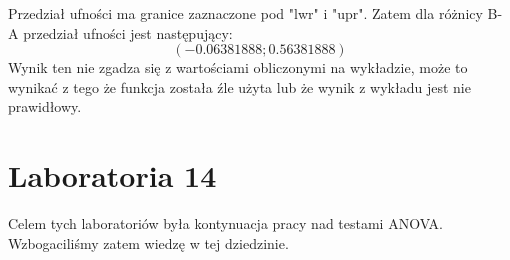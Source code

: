 \documentclass{article}
\begin{document}
Przedział ufności ma granice zaznaczone pod "lwr" i "upr". Zatem dla różnicy B-A przedział ufności jest następujący:
\[ (-0.06381888 ; 0.56381888 ) \]
Wynik ten nie zgadza się z wartościami obliczonymi na wykładzie, może to wynikać z tego że funkcja została źle użyta lub że wynik z wykładu jest nie prawidłowy.

\newpage
\part{Laboratoria 14}
Celem tych laboratoriów była kontynuacja pracy nad testami ANOVA. Wzbogaciliśmy zatem wiedzę w tej dziedzinie.

\end{document}

